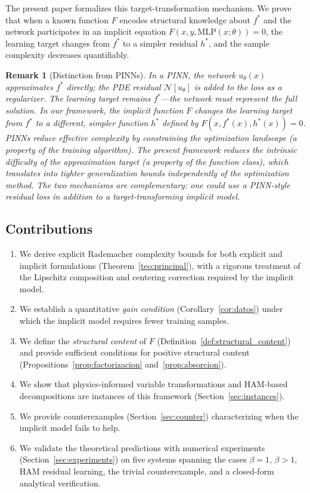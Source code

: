 \documentclass[12pt]{article}
\newtheorem{remark}{Remark}
\newcommand{\MLP}{\mathrm{MLP}}
\begin{document}
The present paper formalizes this target-transformation mechanism.
We prove that when a known function $F$ encodes structural knowledge
about $f^*$ and the network participates in an implicit equation
$F(x, y, \MLP(x;\theta)) = 0$, the learning target changes from
$f^*$ to a simpler residual $h^*$, and the sample complexity
decreases quantifiably.

\begin{remark}[Distinction from PINNs]
\label{rem:pinn_distinction}
In a PINN, the network $u_\theta(x)$ approximates $f^*$ directly;
the PDE residual $\mathcal{N}[u_\theta]$ is added to the loss as a
regularizer.
The learning target remains $f^*$---the network must represent the
full solution.
In our framework, the implicit function $F$ \emph{changes} the
learning target from $f^*$ to a different, simpler function
$h^*$ defined by $F(x, f^*(x), h^*(x)) = 0$.
PINNs reduce effective complexity by constraining the optimization
landscape (a property of the training algorithm).
The present framework reduces the \emph{intrinsic difficulty of the
approximation target} (a property of the function class), which
translates into tighter generalization bounds independently of the
optimization method.
The two mechanisms are complementary: one could use a PINN-style
residual loss \emph{in addition to} a target-transforming implicit
model.
\end{remark}

\subsection{Contributions}

\begin{enumerate}
  \item We derive explicit Rademacher complexity bounds for both
    explicit and implicit formulations
    (Theorem~\ref{teo:principal}), with a rigorous treatment of the
    Lipschitz composition and centering correction required by the
    implicit model.
  \item We establish a quantitative \emph{gain condition}
    (Corollary~\ref{cor:datos}) under which the implicit model
    requires fewer training samples.
  \item We define the \emph{structural content} of $F$
    (Definition~\ref{def:structural_content}) and provide sufficient
    conditions for positive structural content
    (Propositions~\ref{prop:factorizacion} and~\ref{prop:absorcion}).
  \item We show that physics-informed variable transformations and
    HAM-based decompositions are instances of this framework
    (Section~\ref{sec:instances}).
  \item We provide counterexamples
    (Section~\ref{sec:counter}) characterizing when the implicit
    model fails to help.
  \item We validate the theoretical predictions with numerical
    experiments (Section~\ref{sec:experiments}) on five systems
    spanning the cases $\beta = 1$, $\beta > 1$, HAM residual
    learning, the trivial counterexample, and a closed-form
    analytical verification.
\end{enumerate}
\end{document}
